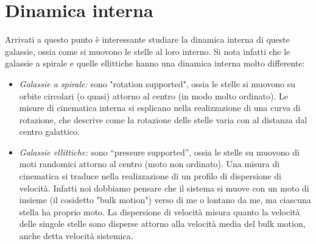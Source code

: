 \section{Dinamica interna}\label{sec:dinamica-interna}
Arrivati a questo punto è interessante studiare la dinamica interna di queste galassie, ossia come si muovono le stelle al loro interno. Si nota infatti che le galassie a spirale e quelle ellittiche hanno una dinamica interna molto differente:

\begin{itemize}
    \item \emph{Galassie a spirale:} sono "rotation supported", ossia le stelle si muovono su orbite circolari (o quasi) attorno al centro (in modo molto ordinato). Le misure di cinematica interna si esplicano nella realizzazione di una curva di rotazione, che descrive come la rotazione delle stelle varia con al distanza dal centro galattico.
    \item \emph{Galassie ellittiche:} sono “pressure supported”, ossia le stelle su muovono di moti randomici attorno al centro (moto non ordinato). Una misura di cinematica si traduce nella realizzazione di un profilo di dispersione di velocità. Infatti noi dobbiamo pensare che il sistema si muove con un moto di insieme (il cosidetto "bulk motion") verso di me o lontano da me, ma ciascuna stella ha proprio moto. La dispersione di velocità misura quanto la velocità delle singole stelle sono disperse attorno alla velocità media del bulk motion, anche detta velocità sistemica.
\end{itemize} 


